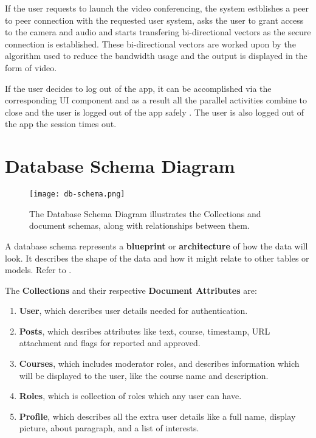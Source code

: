 If the user requests to launch the video conferencing, the system estblishes a peer to peer connection with the requested user system, asks the user to grant access to the camera and audio and starts transfering bi-directional vectors as the secure connection is established.
These bi-directional vectors are worked upon by the algorithm used to reduce the bandwidth usage and the output is displayed in the form of video.

If the user decides to log out of the app, it can be accomplished via the corresponding UI component and as a result all the parallel activities combine to close and the user is logged out of the app safely .
The user is also logged out of the app the session times out.

\section{Database Schema Diagram}

\begin{figure}[h!]
    \centering
    \texttt{[image: db-schema.png]}
    \caption{The Database Schema Diagram illustrates the Collections and document schemas, 
    along with relationships between them.}
    \label{fig:schema}
\end{figure}

A database schema represents a \textbf{blueprint} or \textbf{architecture} of how the data will look. 
It describes the shape of the data and how it might relate to other tables or models. Refer to \label{fig:schema}.

The \textbf{Collections} and their respective \textbf{Document Attributes} are:
\begin{enumerate}
    \item \textbf{User}, which describes user details needed for authentication.
    \item \textbf{Posts}, which desribes attributes like text, course, timestamp, URL attachment 
    and flags for reported and approved.
    \item \textbf{Courses}, which includes moderator roles, and describes information which will 
    be displayed to the user, like the course name and description.
    \item \textbf{Roles}, which is collection of roles which any user can have.
    \item \textbf{Profile}, which describes all the extra user details like a full name, display picture, about paragraph, and a list of interests.
\end{enumerate}


